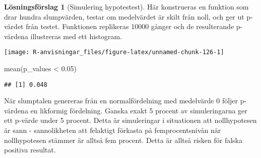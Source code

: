 \documentclass[
]{book}
\newenvironment{Shaded}{\begin{snugshade}}{\end{snugshade}}
\newcommand{\AttributeTok}[1]{\textcolor[rgb]{0.77,0.63,0.00}{#1}}
\newcommand{\ControlFlowTok}[1]{\textcolor[rgb]{0.13,0.29,0.53}{\textbf{#1}}}
\newcommand{\DecValTok}[1]{\textcolor[rgb]{0.00,0.00,0.81}{#1}}
\newcommand{\FloatTok}[1]{\textcolor[rgb]{0.00,0.00,0.81}{#1}}
\newcommand{\FunctionTok}[1]{\textcolor[rgb]{0.00,0.00,0.00}{#1}}
\newcommand{\NormalTok}[1]{#1}
\newcommand{\OtherTok}[1]{\textcolor[rgb]{0.56,0.35,0.01}{#1}}
\newcommand{\SpecialCharTok}[1]{\textcolor[rgb]{0.00,0.00,0.00}{#1}}
\theoremstyle{definition}
\theoremstyle{definition}
\theoremstyle{definition}
\theoremstyle{definition}
\newtheorem{hypothesis}{Lösningsförslag}[chapter]
\theoremstyle{remark}
\begin{document}
\begin{hypothesis}[Simulering hypotestest]
Här konstrueras en funktion som drar hundra slumpvärden, testar om medelvärdet är skilt från noll, och ger ut p-värdet från testet. Funktionen replikeras 10000 gånger och de resulterande p-värdena illustreras med ett histogram.

\begin{Shaded}
\end{Shaded}

\begin{center}\texttt{[image: R-anvisningar\_files/figure-latex/unnamed-chunk-126-1]} \end{center}

\begin{Shaded}
\begin{Highlighting}[]
\FunctionTok{mean}\NormalTok{(p\_values }\SpecialCharTok{\textless{}} \FloatTok{0.05}\NormalTok{)}
\end{Highlighting}
\end{Shaded}

\begin{verbatim}
## [1] 0.048
\end{verbatim}

När slumptalen genereras från en normalfördelning med medelvärde 0 följer p-värdena en likformig fördelning. Ganska exakt 5 procent av simuleringarna ger ett p-värde under 5 procent. Detta är simuleringar i situationen att nollhypotesen är sann - sannolikheten att felaktigt förkasta på femprocentsnivån när nollhypotesen stämmer är alltså fem procent. Detta är alltså risken för falska positiva resultat.


\end{hypothesis}
\end{document}
